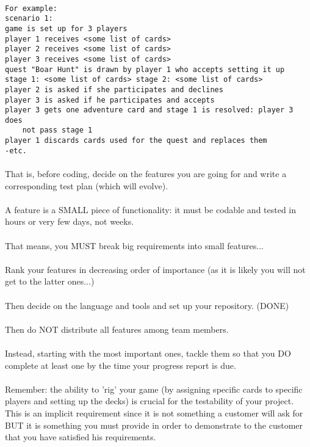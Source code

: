 \documentclass[a4paper,11pt]{report}
\begin{document}
\paragraph{}

\begin{lstlisting}
For example:
scenario 1:
game is set up for 3 players
player 1 receives <some list of cards>
player 2 receives <some list of cards>
player 3 receives <some list of cards>
quest "Boar Hunt" is drawn by player 1 who accepts setting it up
stage 1: <some list of cards> stage 2: <some list of cards>
player 2 is asked if she participates and declines
player 3 is asked if he participates and accepts
player 3 gets one adventure card and stage 1 is resolved: player 3 does 
	not pass stage 1
player 1 discards cards used for the quest and replaces them
-etc.	
\end{lstlisting}

\paragraph{}
That is, before coding, decide on the features you are going for and write a corresponding test plan (which will evolve).
\paragraph{}
A feature is a SMALL piece of functionality: it must be codable and tested in hours or very few days, not weeks.
\paragraph{}
That means, you MUST break big requirements into small features...
\paragraph{}
Rank your features in decreasing order of importance (as it is likely you will not get to the latter ones...)
\paragraph{}
Then decide on the language and tools and set up your repository. (DONE)
\paragraph{}
Then do NOT distribute all features among team members.
\paragraph{}
Instead, starting with the most important ones, tackle them so that you DO complete at least one by the time your progress report is due.
\paragraph{}
Remember: the ability to 'rig' your game (by assigning specific cards to specific players and setting up the decks) is crucial for the testability of your project. This is an implicit requirement since it is not something a customer will ask for BUT it is something you must provide in order to demonstrate to the customer that you have satisfied his requirements.
\end{document}
